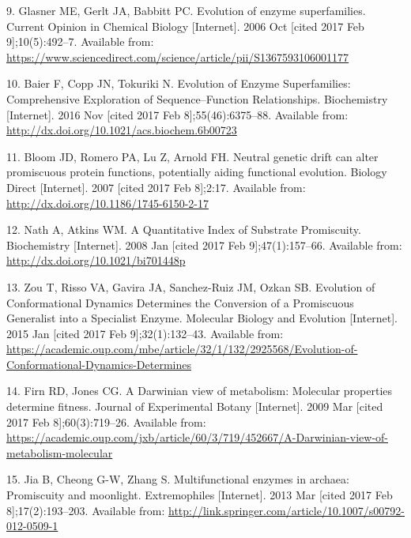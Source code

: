 \documentclass[12pt,twoside]{reedthesis}
\begin{document}
  \hypertarget{ref-glasner_evolution_2006}{}
  9. Glasner ME, Gerlt JA, Babbitt PC. Evolution of enzyme superfamilies.
  Current Opinion in Chemical Biology {[}Internet{]}. 2006 Oct {[}cited
  2017 Feb 9{]};10(5):492--7. Available from:
  \url{https://www.sciencedirect.com/science/article/pii/S1367593106001177}
  
  \hypertarget{ref-baier_evolution_2016}{}
  10. Baier F, Copp JN, Tokuriki N. Evolution of Enzyme Superfamilies:
  Comprehensive Exploration of Sequence--Function Relationships.
  Biochemistry {[}Internet{]}. 2016 Nov {[}cited 2017 Feb
  8{]};55(46):6375--88. Available from:
  \url{http://dx.doi.org/10.1021/acs.biochem.6b00723}
  
  \hypertarget{ref-bloom_neutral_2007}{}
  11. Bloom JD, Romero PA, Lu Z, Arnold FH. Neutral genetic drift can
  alter promiscuous protein functions, potentially aiding functional
  evolution. Biology Direct {[}Internet{]}. 2007 {[}cited 2017 Feb
  8{]};2:17. Available from:
  \url{http://dx.doi.org/10.1186/1745-6150-2-17}
  
  \hypertarget{ref-nath_quantitative_2008}{}
  12. Nath A, Atkins WM. A Quantitative Index of Substrate Promiscuity.
  Biochemistry {[}Internet{]}. 2008 Jan {[}cited 2017 Feb
  9{]};47(1):157--66. Available from:
  \url{http://dx.doi.org/10.1021/bi701448p}
  
  \hypertarget{ref-zou_evolution_2015}{}
  13. Zou T, Risso VA, Gavira JA, Sanchez-Ruiz JM, Ozkan SB. Evolution of
  Conformational Dynamics Determines the Conversion of a Promiscuous
  Generalist into a Specialist Enzyme. Molecular Biology and Evolution
  {[}Internet{]}. 2015 Jan {[}cited 2017 Feb 9{]};32(1):132--43. Available
  from:
  \url{https://academic.oup.com/mbe/article/32/1/132/2925568/Evolution-of-Conformational-Dynamics-Determines}
  
  \hypertarget{ref-firn_darwinian_2009}{}
  14. Firn RD, Jones CG. A Darwinian view of metabolism: Molecular
  properties determine fitness. Journal of Experimental Botany
  {[}Internet{]}. 2009 Mar {[}cited 2017 Feb 8{]};60(3):719--26. Available
  from:
  \url{https://academic.oup.com/jxb/article/60/3/719/452667/A-Darwinian-view-of-metabolism-molecular}
  
  \hypertarget{ref-jia_multifunctional_2013}{}
  15. Jia B, Cheong G-W, Zhang S. Multifunctional enzymes in archaea:
  Promiscuity and moonlight. Extremophiles {[}Internet{]}. 2013 Mar
  {[}cited 2017 Feb 8{]};17(2):193--203. Available from:
  \url{http://link.springer.com/article/10.1007/s00792-012-0509-1}
  
\end{document}

